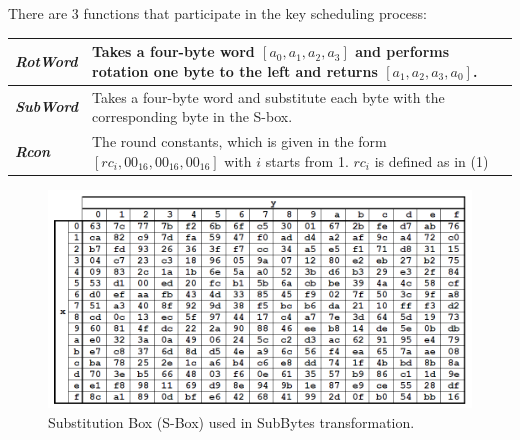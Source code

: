 \documentclass[a4paper, 10pt]{article}
\begin{document}
\begin{multicols}{2}
                There are 3 functions that participate in the key scheduling process:

                    \setlength{\tabcolsep}{5pt} %
                    \renewcommand{\arraystretch}{1.5} %
                    \noindent
                        \begin{tabular}{m{2cm} m{6cm}}
                            \textbf{\textit{RotWord}} & Takes a four-byte word $[a_{0},a_{1},a_{2},a_{3}]$ and performs rotation one byte to the left and returns $[a_{1},a_{2},a_{3},a_{0}]$.\\
                            \hline
                            \textbf{\textit{SubWord}} & Takes a four-byte word and substitute each byte with the corresponding byte in the S-box.\\
                            \hline
                            \textbf{\textit{Rcon}} & The round constants, which is given in the form $[rc_{i},00_{16},00_{16},00_{16}]$ with $i$ starts from 1. $rc_{i}$ is defined as in (1)\\
                        \end{tabular}
                    \end{multicols}

                    \noindent
                    \begin{figure}[t]
                        \centering
                        \includegraphics[width=.75\textwidth]{S-Box.png}
                        \caption{Substitution Box (S-Box) used in SubBytes transformation.}
                        \label{fig:SBox}
                    \end{figure}
\end{document}

